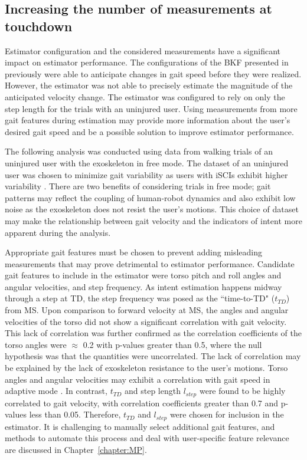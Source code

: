 \subsection{Increasing the number of measurements at touchdown}\label{sec:increase_meas}
Estimator configuration and the considered measurements have a significant impact on estimator performance. The configurations of the BKF presented in previously were able to anticipate changes in gait speed before they were realized. However, the estimator was not able to precisely estimate the magnitude of the anticipated velocity change. The estimator was configured to rely on only the step length for the trials with an uninjured user. Using measurements from more gait features during estimation may provide more information about the user's desired gait speed and be a possible solution to improve estimator performance.

The following analysis was conducted using data from walking trials of an uninjured user with the exoskeleton in free mode. The dataset of an uninjured user was chosen to minimize gait variability as users with iSCIs exhibit higher variability \cite{sohn2018variability}. There are two benefits of considering trials in free mode; gait patterns may reflect the coupling of human-robot dynamics and also exhibit low noise as the exoskeleton does not resist the user's motions. This choice of dataset may make the relationship between gait velocity and the indicators of intent more apparent during the analysis. 

Appropriate gait features must be chosen to prevent adding misleading measurements that may prove detrimental to estimator performance. Candidate gait features to include in the estimator were torso pitch and roll angles and angular velocities, and step frequency. As intent estimation happens midway through a step at TD, the step frequency was posed as the ``time-to-TD" ($ t_{TD} $) from MS. Upon comparison to forward velocity at MS, the angles and angular velocities of the torso did not show a significant correlation with gait velocity. This lack of correlation was further confirmed as the correlation coefficients of the torso angles were $ \approx $ 0.2 with p-values greater than 0.5, where the null hypothesis was that the quantities were uncorrelated. The lack of correlation may be explained by the lack of exoskeleton resistance to the user's motions. Torso angles and angular velocities may exhibit a correlation with gait speed in adaptive mode \cite{suzuki2007intention}. In contrast, $ t_{TD} $ and step length $ l_{step} $ were found to be highly correlated to gait velocity, with correlation coefficients greater than 0.7 and p-values less than 0.05. Therefore, $ t_{TD} $ and $ l_{step} $ were chosen for inclusion in the estimator. It is challenging to manually select additional gait features, and methods to automate this process and deal with user-specific feature relevance are discussed in Chapter~\ref{chapter:MP}.

